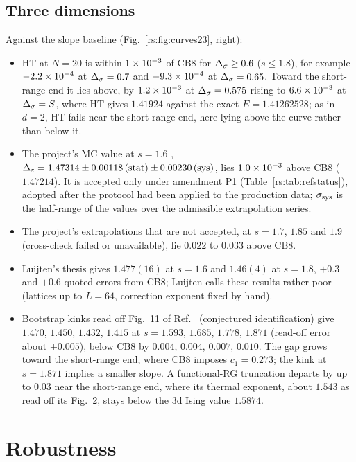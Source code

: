 \subsection{Three dimensions}
Against the slope baseline (Fig.~\ref{rs:fig:curves23}, right):
\begin{itemize}
\item HT at $N=20$ is within $1\times10^{-3}$ of CB8 for $\Delta_\sigma\ge0.6$ ($s\le1.8$), for example
$-2.2\times10^{-4}$ at $\Delta_\sigma=0.7$ and $-9.3\times10^{-4}$ at $\Delta_\sigma=0.65$. Toward the short-range end
it lies above, by $1.2\times10^{-3}$ at $\Delta_\sigma=0.575$ rising to $6.6\times10^{-3}$ at $\Delta_\sigma=S$, where HT
gives $1.41924$ against the exact $E=1.41262528$; as in $d=2$, HT fails near the short-range
end, here lying above the curve rather than below it.
\item The project's MC value at $s=1.6$ \cite{rs:noteMC}, $\Delta_\varepsilon=1.47314\pm0.00118\,({\rm
stat})\pm0.00230\,({\rm sys})$, lies $1.0\times10^{-3}$ above CB8 ($1.47214$). It is accepted
only under amendment P1 (Table~\ref{rs:tab:refstatus}), adopted after the protocol had been
applied to the production data; $\sigma_{\rm sys}$ is the half-range of the values over the
admissible extrapolation series.
\item The project's extrapolations that are not accepted, at $s=1.7$, $1.85$ and $1.9$
(cross-check failed or unavailable), lie $0.022$ to $0.033$ above CB8.
\item Luijten's thesis gives $1.477(16)$ at $s=1.6$ and $1.46(4)$ at $s=1.8$, $+0.3$ and
$+0.6$ quoted errors from CB8; Luijten calls these results rather poor (lattices up to
$L=64$, correction exponent fixed by hand).
\item Bootstrap kinks read off Fig.~11 of Ref.~\cite{rs:Behan:2023ile} (conjectured
identification) give $1.470$, $1.450$, $1.432$, $1.415$ at $s=1.593$, $1.685$, $1.778$,
$1.871$ (read-off error about $\pm0.005$), below CB8 by $0.004$, $0.004$, $0.007$, $0.010$. The
gap grows toward the short-range end, where CB8 imposes $c_1=0.273$; the kink at $s=1.871$
implies a smaller slope. A functional-RG truncation \cite{rs:Defenu:2014bea} departs by up to
$0.03$ near the short-range end, where its thermal exponent, about $1.543$ as read off its
Fig.~2, stays below the 3d Ising value $1.5874$.
\end{itemize}

\section{Robustness}\label{rs:sec:robust}
